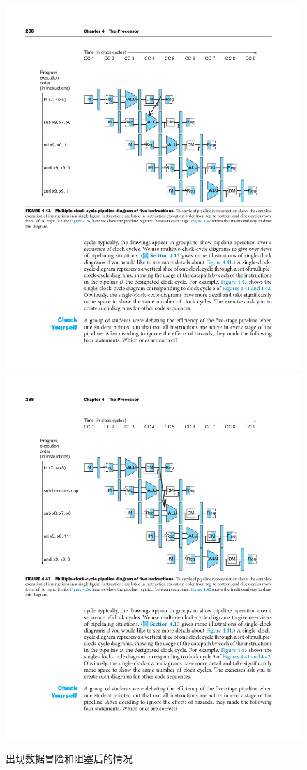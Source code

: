 \documentclass[UTF8,a4paper,autofakebold,15pt]{ctexart}
\begin{document}
\begin{figure}
	\centering
	\includegraphics[scale=.9]{fig8.pdf}
	\includegraphics[scale=.9]{fig9.pdf}
	\caption{出现数据冒险和阻塞后的情况}
	\label{fig:label8}
\end{figure}
\end{document}
